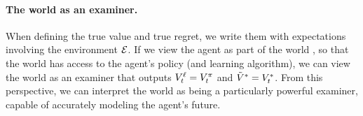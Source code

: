 \paragraph{The world as an examiner.} When defining the true value and true regret, we write them with expectations involving the environment $\mathcal{E}$.
If we view the agent as part of the world \citep{lewandowski2025bigger}, so that the world has access to the agent's policy (and learning algorithm), we can view the world as an examiner that outputs $V^{\ell}_t =V^\pi_t$ and $\tilde{V}^* =V^*_t$.
From this perspective, we can interpret the world as being a particularly powerful examiner, capable of accurately modeling the agent's future.

